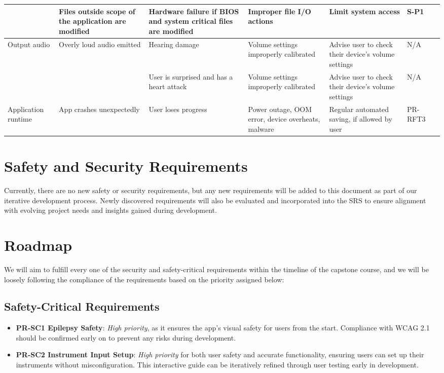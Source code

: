 \documentclass{article}
\begin{document}
\begin{longtable}{|>{\raggedright}p{2cm}|>{\raggedright}p{2.5cm}|>{\raggedright}p{2.5cm}|>{\raggedright}p{2.5cm}|>{\raggedright}p{2.5cm}|p{1.5cm}|p{1.5cm}|}
  \cline{2-7}
    & Files outside scope of the application are modified & Hardware failure if BIOS and system critical files are modified & Improper file I/O actions & Limit system access & S-P1 & \\
  \hline
    Output \newline audio & Overly loud audio emitted & Hearing damage & Volume settings improperly calibrated & Advise user to check their device's volume settings & N/A & \\
  \cline{3-7}
    & & User is surprised and has a heart attack & Volume settings improperly calibrated & Advise user to check their device's volume settings & N/A & \\ 
  \hline
    Application runtime & App crashes unexpectedly & User loses progress & Power outage, OOM error, device overheats, malware & Regular automated saving, if allowed by user & PR-RFT3 & \\
  \hline
\end{longtable}

\section{Safety and Security Requirements}

Currently, there are no new safety or security requirements, but any new requirements will be added to this document as part of our iterative development process. Newly discovered requirements will also be evaluated and incorporated into the SRS to ensure alignment with evolving project needs and insights gained during development.


\section{Roadmap}

We will aim to fulfill every one of the security and safety-critical requirements within the timeline of the capstone course, and we will be loosely following the compliance of the requirements based on the priority assigned below:

\subsection{Safety-Critical Requirements}
\begin{itemize}
    \item \textbf{PR-SC1 Epilepsy Safety}: \textit{High priority}, as it ensures the app’s visual safety for users from the start. Compliance with WCAG 2.1 should be confirmed early on to prevent any risks during development.
    \item \textbf{PR-SC2 Instrument Input Setup}: \textit{High priority} for both user safety and accurate functionality, ensuring users can set up their instruments without misconfiguration. This interactive guide can be iteratively refined through user testing early in development.
\end{itemize}
\end{document}
